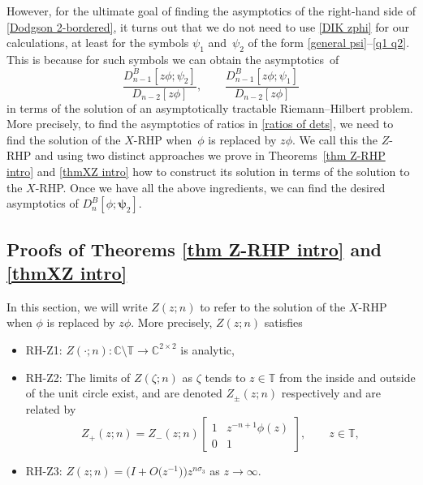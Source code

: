 \documentclass[10pt,a4paper]{amsart}
\numberwithin{equation}{section}
\newcommand{\C}{{\mathbb C}}
\newcommand{\T}{{\mathbb T}}
\newcommand{\ze}{\zeta}
\begin{document}
	However, for the ultimate goal of finding the asymptotics of the right-hand side of \eqref{Dodgson 2-bordered}, it turns out that we do not need to use \eqref{DIK zphi} for our calculations, at least for the symbols $\psi_1$ and~$\psi_2$ of the form \eqref{general psi}--\eqref{q1 q2}. This is because for such symbols we can obtain the asymptotics~of
	\begin{equation}\label{ratios of dets}
		\frac{D^B_{n-1}[z\phi;\psi_2]}{D_{n-2}[z \phi]},\qquad \frac{D^B_{n-1}[z\phi;\psi_1]}{D_{n-2}[z \phi]}
	\end{equation}
	in terms of the solution of an asymptotically tractable Riemann--Hilbert problem. More precisely, to find the asymptotics of ratios in \eqref{ratios of dets}, we need to find the solution of the $X$-RHP when~$\phi$ is replaced by $z\phi$. We call this the $Z$-RHP and using two distinct approaches we prove in Theorems~\ref{thm Z-RHP intro} and \ref{thmXZ intro} how to construct its solution in terms of the solution to the $X$-RHP. Once we have all the above ingredients, we can find the desired asymptotics of $		D^B_n[\phi;\boldsymbol{\psi}_2]$.
	
	
\subsection{Proofs of Theorems \ref{thm Z-RHP intro} and \ref{thmXZ intro}}
	
	In this section, we will write $Z(z;n)$ to refer to the solution of the $X$-RHP when $\phi$ is replaced by $z\phi$. More precisely, $Z(z;n)$ satisfies
	\begin{itemize}\itemsep=0pt
		\item RH-Z1: %
$Z(\cdot;n)\colon \C\setminus \T \to \C^{2\times2}$ is analytic,
		\item RH-Z2: %
The limits of $Z(\ze;n)$ as $\ze$ tends to $z \in \T $ from the inside and outside of the unit circle exist, and are denoted $Z_{\pm}(z;n)$ respectively and are related by
		\[
			Z_+(z;n)=Z_-(z;n)\begin{bmatrix}
				1 & z^{-n+1}\phi(z) \\
				0 & 1
			\end{bmatrix}, \qquad z \in \T,
		\]
		
		\item RH-Z3: %
$Z(z;n)=\big( I + O\big(z^{-1}\big) \big) z^{n \sigma_3}$ as $z \to \infty$.
	\end{itemize}
	
\end{document}
